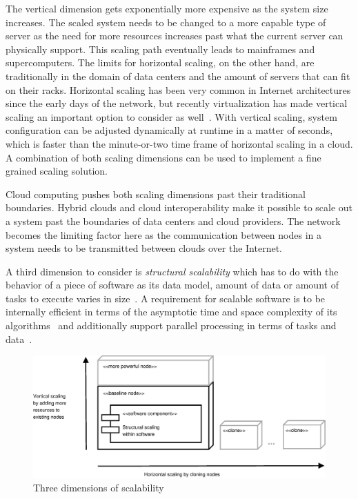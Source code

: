 \documentclass[english]{tktltiki2}
\theoremstyle{definition}
\theoremstyle{remark}
\begin{document}
The vertical dimension gets exponentially more expensive as the system size
increases. The scaled system needs to be changed to a more capable type of
server as the need for more resources increases past what the current server can
physically support. This scaling path eventually leads to mainframes and
supercomputers. The limits for horizontal scaling, on the other hand, are
traditionally in the domain of data centers and the amount of servers that can
fit on their racks. Horizontal scaling has been very common in Internet
architectures since the early days of the network, but recently virtualization
has made vertical scaling an important option to consider as well~\cite{VRB11}.
With vertical scaling, system configuration can be adjusted dynamically at
runtime in a matter of seconds, which is faster than the minute-or-two time
frame of horizontal scaling in a cloud. A combination of both scaling dimensions
can be used to implement a fine grained scaling solution.

Cloud computing pushes both scaling dimensions past their traditional
boundaries. Hybrid clouds and cloud interoperability make it possible to scale
out a system past the boundaries of data centers and cloud providers. The
network becomes the limiting factor here as the communication between nodes in a
system needs to be transmitted between clouds over the Internet.

A third dimension to consider is \emph{structural scalability} which has to do
with the behavior of a piece of software as its data model, amount of data or
amount of tasks to execute varies in size~\cite{handbook-scaling}. A requirement
for scalable software is to be internally efficient in terms of the asymptotic
time and space complexity of its algorithms~\cite{algorithmBook} and
additionally support parallel processing in terms of tasks and
data~\cite{foundationsOfParallelBook}.

\begin{figure}[htbp]
	\includegraphics[width=\textwidth]{images/scalingDimensions}
	\caption{Three dimensions of scalability}
	\label{fig:scalabilityDimensions}
\end{figure}
\end{document}
